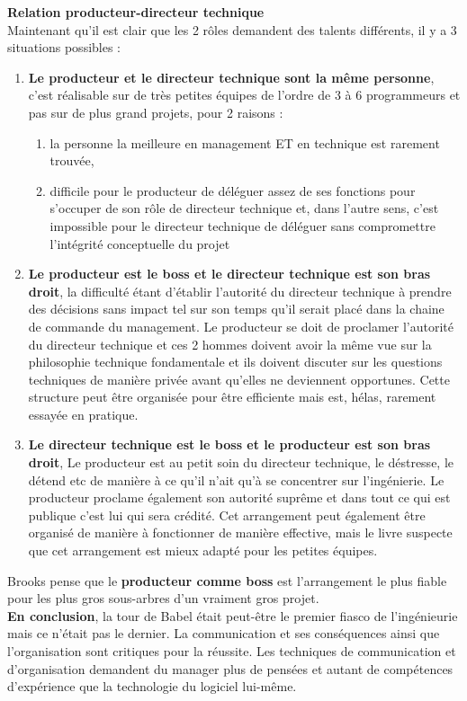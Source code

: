 \documentclass[runningheads]{llncs}
\begin{document}
\noindent\textbf{Relation producteur-directeur technique}\\
Maintenant qu'il est clair que les 2 rôles demandent des talents différents, il y a 3 situations possibles :
\begin{enumerate}
\item \textbf{Le producteur et le directeur technique sont la même personne}, c'est réalisable sur de très petites équipes de 
l'ordre de 3 à 6 programmeurs et pas sur de plus grand projets, pour 2 raisons :
	\begin{enumerate}
	\item la personne la meilleure en management ET en technique est rarement trouvée,
	\item difficile pour le producteur de déléguer assez de ses fonctions pour s'occuper de son rôle de directeur technique et, 
	dans l'autre sens, c'est impossible pour le directeur technique de déléguer sans compromettre l'intégrité conceptuelle du 
	projet
	\end{enumerate}
\item \textbf{Le producteur est le boss et le directeur technique est son bras droit}, la difficulté étant d'établir l'autorité du
directeur technique à prendre des décisions sans impact tel sur son temps qu'il serait placé dans la chaine de commande du 
management. Le producteur se doit de proclamer l'autorité du directeur technique et ces 2 hommes doivent avoir la même vue sur la 
philosophie technique fondamentale et ils doivent discuter sur les questions techniques de manière privée avant qu'elles ne 
deviennent opportunes. Cette structure peut être organisée pour être efficiente mais est, hélas, rarement essayée en pratique.
\item \textbf{Le directeur technique est le boss et le producteur est son bras droit}, Le producteur est au petit soin du 
directeur technique, le déstresse, le détend etc de manière à ce qu'il n'ait qu'à se concentrer sur l'ingénierie. Le producteur 
proclame également son autorité suprême et dans tout ce qui est publique c'est lui qui sera crédité. Cet arrangement peut 
également être organisé de manière à fonctionner de manière effective, mais le livre suspecte que cet arrangement est mieux adapté
pour les petites équipes.
\end{enumerate}
Brooks pense que le \textbf{producteur comme boss} est l'arrangement le plus fiable pour les plus gros sous-arbres d'un vraiment 
gros projet. \\

\textbf{En conclusion}, la tour de Babel était peut-être le premier fiasco de l'ingénieurie mais ce n'était pas le dernier. La 
communication et ses conséquences ainsi que l'organisation sont critiques pour la réussite. Les techniques de communication et 
d'organisation demandent du manager plus de pensées et autant de compétences d'expérience que la technologie du logiciel lui-même.
\end{document}
